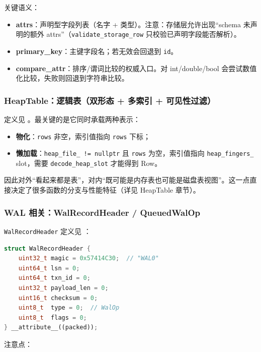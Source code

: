 关键语义：

\begin{itemize}
  \item \textbf{attrs}：声明型字段列表（名字 + 类型）。注意：存储层允许出现“schema 未声明的额外 attrs”（\texttt{validate\_storage\_row} 只校验已声明字段能否解析）。
  \item \textbf{primary\_key}：主键字段名；若无效会回退到 \texttt{id}。
  \item \textbf{compare\_attr}：排序/谓词比较的权威入口。对 int/double/bool 会尝试数值化比较，失败则回退到字符串比较。
\end{itemize}

\subsubsection{HeapTable：逻辑表（双形态 + 多索引 + 可见性过滤）}

定义见 。最关键的是它同时承载两种表示：

\begin{itemize}
  \item \textbf{物化}：\texttt{rows} 非空，索引值指向 \texttt{rows} 下标；
  \item \textbf{懒加载}：\texttt{heap\_file\_ != nullptr} 且 \texttt{rows} 为空，索引值指向 \texttt{heap\_fingers\_} slot，需要 \texttt{decode\_heap\_slot} 才能得到 Row。
\end{itemize}

因此对外“看起来都是表”，对内“既可能是内存表也可能是磁盘表视图”。这一点直接决定了很多函数的分支与性能特征（详见 HeapTable 章节）。

\subsubsection{WAL 相关：WalRecordHeader / QueuedWalOp}

\texttt{WalRecordHeader} 定义见 ：

\begin{lstlisting}[language=C++,caption={WalRecordHeader（原型）}]
struct WalRecordHeader {
    uint32_t magic = 0x57414C30;  // "WAL0"
    uint64_t lsn = 0;
    uint64_t txn_id = 0;
    uint32_t payload_len = 0;
    uint16_t checksum = 0;
    uint8_t  type = 0;  // WalOp
    uint8_t  flags = 0;
} __attribute__((packed));
\end{lstlisting}

注意点：

